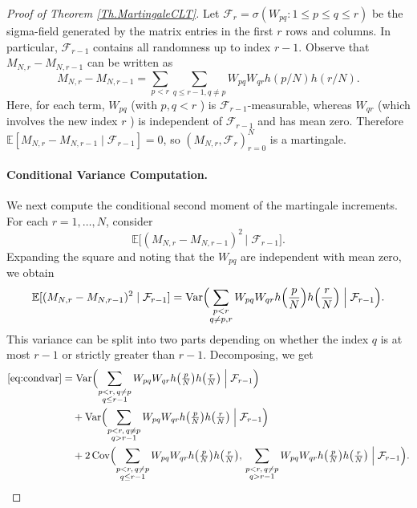 \documentclass[11pt, reqno]{amsart}
\numberwithin{equation}{section}
\begin{document}
\begin{proof}[Proof of Theorem \ref{Th.MartingaleCLT}]
 Let $\mathcal{F}_r = \sigma(W_{pq}: 1 \le p \le q \le r)$ be the sigma-field generated by the matrix entries in the first $r$ rows and columns.  In particular, $\mathcal{F}_{r-1}$ contains all randomness up to index $r-1$.
Observe that $M_{N, r}-M_{N, r-1}$ can be written as
$$
M_{N, r}-M_{N, r-1}=\sum_{p<r} \sum_{q \leq r-1, q \neq p} W_{p q} W_{q r} h(p / N) h(r / N) .
$$
Here, for each term, $W_{p q}$ (with $p, q<r$ ) is $\mathcal{F}_{r-1}$-measurable, whereas $W_{q r}$ (which involves the new index $r$ ) is independent of $\mathcal{F}_{r-1}$ and has mean zero. Therefore $\mathbb{E}\left[M_{N, r}-M_{N, r-1} \mid \mathcal{F}_{r-1}\right]=0$, so $\left(M_{N, r}, \mathcal{F}_r\right)_{r=0}^N$ is a martingale.

\paragraph{\bf Conditional Variance Computation.}

We next compute the conditional second moment of the martingale increments.  For each $r=1,\dots,N$, consider
\[
\mathbb{E}\bigl[(M_{N,r} - M_{N,r-1})^2 \,\big|\; \mathcal{F}_{r-1}\bigr].
\]
Expanding the square and noting that the $W_{pq}$ are independent with mean zero, we obtain
\begin{equation}\label{eq:condvar}
\mathbb{E}[(M_{N,r} - M_{N,r-1})^2 \mid \mathcal{F}_{r-1}]
 = \mathrm{Var}\Bigl(\sum_{\substack{p<r\\ q\neq p,r}} W_{pq}W_{qr}h\Bigl(\frac{p}{N}\Bigr)h\Bigl(\frac{r}{N}\Bigr)\Bigm| \mathcal{F}_{r-1}\Bigr).
\end{equation}
This variance can be split into two parts depending on whether the index $q$ is at most $r-1$ or strictly greater than $r-1$.  Decomposing, we get
\[
\begin{aligned}
\eqref{eq:condvar}
 &= \mathrm{Var}\Bigl(\sum_{\substack{p<r,\,q\neq p\\ q\le r-1}}W_{pq}W_{qr}h\bigl(\tfrac{p}{N}\bigr)h\bigl(\tfrac{r}{N}\bigr)\Bigm|\mathcal{F}_{r-1}\Bigr)\\
 &\quad + \mathrm{Var}\Bigl(\sum_{\substack{p<r,\,q\neq p\\ q> r-1}}W_{pq}W_{qr}h\bigl(\tfrac{p}{N}\bigr)h\bigl(\tfrac{r}{N}\bigr)\Bigm|\mathcal{F}_{r-1}\Bigr)\\
 &\quad + 2\,\mathrm{Cov}\Bigl(\sum_{\substack{p<r,\,q\neq p\\ q\le r-1}}W_{pq}W_{qr}h\bigl(\tfrac{p}{N}\bigr)h\bigl(\tfrac{r}{N}\bigr),\,
      \sum_{\substack{p<r,\,q\neq p\\ q> r-1}}W_{pq}W_{qr}h\bigl(\tfrac{p}{N}\bigr)h\bigl(\tfrac{r}{N}\bigr)\Bigm|\mathcal{F}_{r-1}\Bigr).
\end{aligned}
\]


\end{proof}
\end{document}
